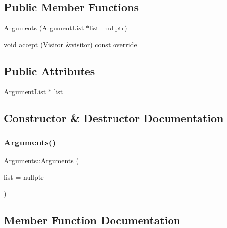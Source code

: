 \subsection*{Public Member Functions}
\begin{DoxyCompactItemize}
\item 
\hyperlink{struct_arguments_a3ef5b61e1012059e49adb9743c7abcb0}{Arguments} (\hyperlink{struct_argument_list}{Argument\+List} $\ast$\hyperlink{struct_arguments_a05f7d1acffd6f78b6aa33f62dd7984af}{list}=nullptr)
\item 
void \hyperlink{struct_arguments_ac4fa9c45af3f2e9f0b989ed7718fc75d}{accept} (\hyperlink{struct_visitor}{Visitor} \&visitor) const override
\end{DoxyCompactItemize}
\subsection*{Public Attributes}
\begin{DoxyCompactItemize}
\item 
\hyperlink{struct_argument_list}{Argument\+List} $\ast$ \hyperlink{struct_arguments_a05f7d1acffd6f78b6aa33f62dd7984af}{list}
\end{DoxyCompactItemize}


\subsection{Constructor \& Destructor Documentation}
\mbox{\label{struct_arguments_a3ef5b61e1012059e49adb9743c7abcb0}} 
\subsubsection{\texorpdfstring{Arguments()}{Arguments()}}
{\footnotesize\ttfamily Arguments\+::\+Arguments (\begin{DoxyParamCaption}\item[{\hyperlink{struct_argument_list}{Argument\+List} $\ast$}]{list = {\ttfamily nullptr} }\end{DoxyParamCaption})\hspace{0.3cm}{\ttfamily [inline]}}



\subsection{Member Function Documentation}
\mbox{\label{struct_arguments_ac4fa9c45af3f2e9f0b989ed7718fc75d}} 
